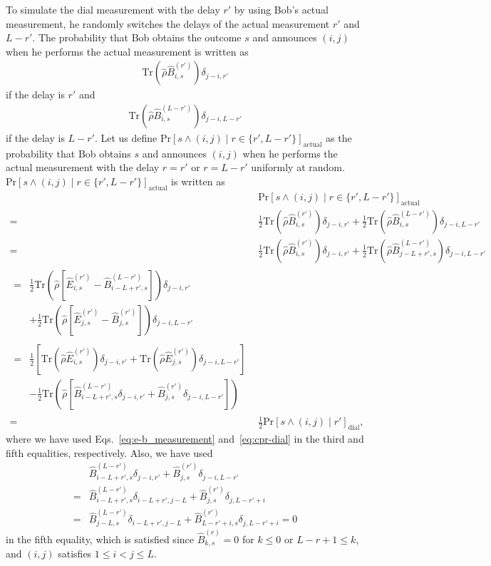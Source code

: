 \documentclass[twocolumn,superscriptaddress,pra,footinbib,notitlepage]{revtex4-1}
\newcommand{\tr}[1]{\mathrm{Tr}\left(#1\right)}
\newcommand{\1}{\mbox{1}\hspace{-0.25em}\mbox{l}}
\newcommand{\cpr}[2]{\mathrm{Pr}\left[#1\middle|#2\right]}
\begin{document}
To simulate the dial measurement with the delay $r'$ by using Bob's actual measurement, he randomly switches the delays of the actual measurement $r'$ and $L-r'$. The probability that Bob obtains the outcome $s$ and announces $(i, j)$ when he performs the actual measurement is written as
\begin{align}
\tr{\hat{\rho}\hat{B}_{i, s}^{(r')}}\delta_{j-i, r'}
\end{align}
if the delay is $r'$ and
\begin{align}
\tr{\hat{\rho}\hat{B}_{i, s}^{(L-r')}}\delta_{j-i, L-r'}
\end{align}
if the delay is $L-r'$. Let us define $\cpr{s\wedge(i,j)}{r\in\{r', L-r'\}}_\textrm{actual}$ as the probability that Bob obtains $s$ and announces $(i, j)$ when he performs the actual measurement with the delay $r=r'$ or $r=L-r'$ uniformly at random. $\cpr{s\wedge(i, j)}{r\in\{r', L-r'\}}_\textrm{actual}$ is written as
\begin{align}
&\cpr{s\wedge(i, j)}{r\in\{r', L-r'\}}_\textrm{actual}\nonumber\\
=&\frac{1}{2}\tr{\hat{\rho}\hat{B}_{i, s}^{(r')}}\delta_{j-i, r'}+\frac{1}{2}\tr{\hat{\rho}\hat{B}_{i, s}^{(L-r')}}\delta_{j-i, L-r'}\nonumber\\
=&\frac{1}{2}\tr{\hat{\rho}\hat{B}_{i, s}^{(r')}}\delta_{j-i, r'}+\frac{1}{2}\tr{\hat{\rho}\hat{B}_{j-L+r', s}^{(L-r')}}\delta_{j-i, L-r'}\nonumber\\
\begin{split}
=&\frac{1}{2}\tr{\hat{\rho}\left[\hat{E}_{i, s}^{(r')}-\hat{B}_{i-L+r', s}^{(L-r')}\right]}\delta_{j-i, r'}\\
&+\frac{1}{2}\tr{\hat{\rho}\left[\hat{E}_{j, s}^{(r')}-\hat{B}_{j, s}^{(r')}\right]}\delta_{j-i, L-r'}
\end{split}\nonumber\\
\begin{split}
=&\frac{1}{2}\left[\tr{\hat{\rho}\hat{E}_{i, s}^{(r')}}\delta_{j-i, r'}+\tr{\hat{\rho}\hat{E}_{j, s}^{(r')}}\delta_{j-i, L-r'}\right]\\
&-\frac{1}{2}\tr{\hat{\rho}\left[\hat{B}_{i-L+r', s}^{(L-r')}\delta_{j-i, r'}+\hat{B}_{j, s}^{(r')}\delta_{j-i, L-r'}\right]}
\end{split}\nonumber\\
=&\frac{1}{2}\cpr{s\wedge(i, j)}{r'}_\textrm{dial},
\end{align}
where we have used Eqs.~\eqref{eq:e-b_measurement} and~\eqref{eq:cpr-dial} in the third and fifth equalities, respectively. Also, we have used
\begin{align}
&\hat{B}_{i-L+r', s}^{(L-r')}\delta_{j-i, r'}+\hat{B}_{j, s}^{(r')}\delta_{j-i, L-r'}\nonumber\\
=&\hat{B}_{i-L+r', s}^{(L-r')}\delta_{i-L+r', j-L}+\hat{B}_{j, s}^{(r')}\delta_{j, L-r'+i}\nonumber\\
=&\hat{B}_{j-L, s}^{(L-r')}\delta_{i-L+r', j-L}+\hat{B}_{L-r'+i, s}^{(r')}\delta_{j, L-r'+i}=0
\label{eq:actual_measurement_vanishing}
\end{align}
in the fifth equality, which is satisfied since $\hat{B}_{k, s}^{(r)}=0$ for $k\leq0 $ or $L-r+1\leq k$, and $(i, j)$ satisfies $1\leq i<j\leq L$.
\end{document}
